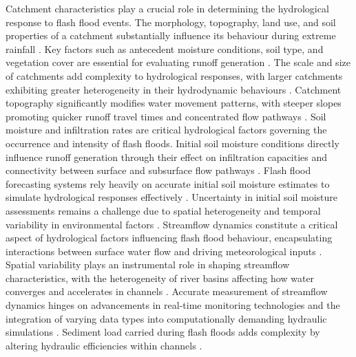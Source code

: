 Catchment  characteristics play a crucial role in determining the hydrological response to flash flood events. The morphology, topography, land use, and soil properties of a catchment substantially influence its behaviour during extreme rainfall \citep{Henao2022, Liu2011}. Key factors such as antecedent moisture conditions, soil type, and vegetation cover are essential for evaluating runoff generation \citep{Henao2022a, Liu2011}. The scale and size of catchments add complexity to hydrological responses, with larger catchments exhibiting greater heterogeneity in their hydrodynamic behaviours \citep{Luong2021}. Catchment topography significantly modifies water movement patterns, with steeper slopes promoting quicker runoff travel times and concentrated flow pathways \citep{Liu2011, Maqtan2022a}. Soil moisture and infiltration rates are critical hydrological factors governing the occurrence and intensity of flash floods. Initial soil moisture conditions directly influence runoff generation through their effect on infiltration capacities and connectivity between surface and subsurface flow pathways \citep{Yatheendradas2008}. Flash flood forecasting systems rely heavily on accurate initial soil moisture estimates to simulate hydrological responses effectively \citep{Yatheendradas2008, AlRawas2024, Xing2019a}. Uncertainty in initial soil moisture assessments remains a challenge due to spatial heterogeneity and temporal variability in environmental factors \citep{Yatheendradas2008, AlRawas2024}. Streamflow dynamics constitute a critical aspect of hydrological factors influencing flash flood behaviour, encapsulating interactions between surface water flow and driving meteorological inputs \citep{Yang2022}. Spatial variability plays an instrumental role in shaping streamflow characteristics, with the heterogeneity of river basins affecting how water converges and accelerates in channels \citep{Zhang2024}. Accurate measurement of streamflow dynamics hinges on advancements in real-time monitoring technologies and the integration of varying data types into computationally demanding hydraulic simulations \citep{Msigwa2024, Barthold2015}. Sediment load carried during flash floods adds complexity by altering hydraulic efficiencies within channels \citep{Kim2011}.


